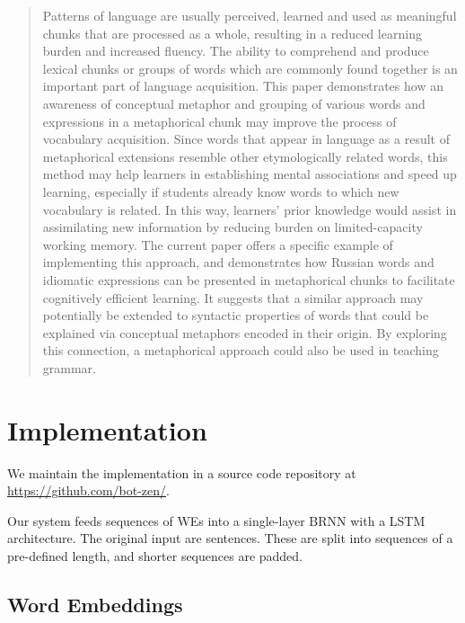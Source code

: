 \documentclass[11pt,a4paper]{article}
\begin{document}
\begin{quotation}
Patterns of language are usually perceived, learned and used as meaningful chunks that are processed as a whole, resulting in a reduced learning burden and increased fluency. The ability to comprehend and produce lexical chunks or groups of words which are commonly found together is an important part of language acquisition. This paper demonstrates how an awareness of conceptual metaphor and grouping of various words and expressions in a metaphorical chunk may improve the process of vocabulary acquisition. Since words that appear in language as a result of metaphorical extensions resemble other etymologically related words, this method may help learners in establishing mental associations and speed up learning, especially if students already know words to which new vocabulary is related. In this way, learners' prior knowledge would assist in assimilating new information by reducing burden on limited-capacity working memory. The current paper offers a specific example of implementing this approach, and demonstrates how Russian words and idiomatic expressions can be presented in metaphorical chunks to facilitate cognitively efficient learning. It suggests that a similar approach may potentially be extended to syntactic properties of words that could be explained via conceptual metaphors encoded in their origin. By exploring this connection, a metaphorical approach could also be used in teaching grammar.
\end{quotation}
\cite{}

\section{Implementation} %
\label{sec:implementation}

We maintain the implementation in a source code repository at
\url{https://github.com/bot-zen/}.  

Our system feeds sequences of WEs into a single-layer BRNN with a LSTM architecture. The original input are sentences. These are split into sequences of a pre-defined length, and shorter sequences are padded.


\subsection{Word Embeddings} %
\end{document}
